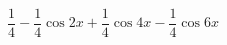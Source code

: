 \begin{displaymath}
 \dfrac{1}{4} -\dfrac{1}{4 }\cos 2x + \dfrac{1}{4}\cos 4x -\dfrac{1}{4 }\cos 6x 
\end{displaymath}
